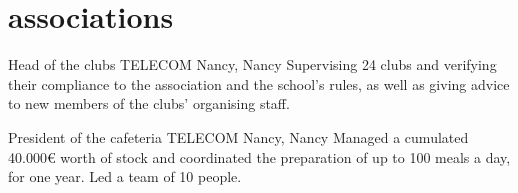 \documentclass[]{lemaki-cv}
\begin{document}

		\section{associations}

		\begin{entrylist}


			{Head of the clubs}
			{TELECOM Nancy, Nancy}
			{Supervising 24 clubs and verifying their compliance to the
			association and the school's rules, as well as giving advice to new
			members of the clubs' organising staff.}


			{President of the cafeteria}
			{TELECOM Nancy, Nancy}
			{Managed a cumulated 40.000€ worth of stock and coordinated the
			preparation of up to 100 meals a day, for one year. Led a team of 10
			people.}


		\end{entrylist}
\end{document}
